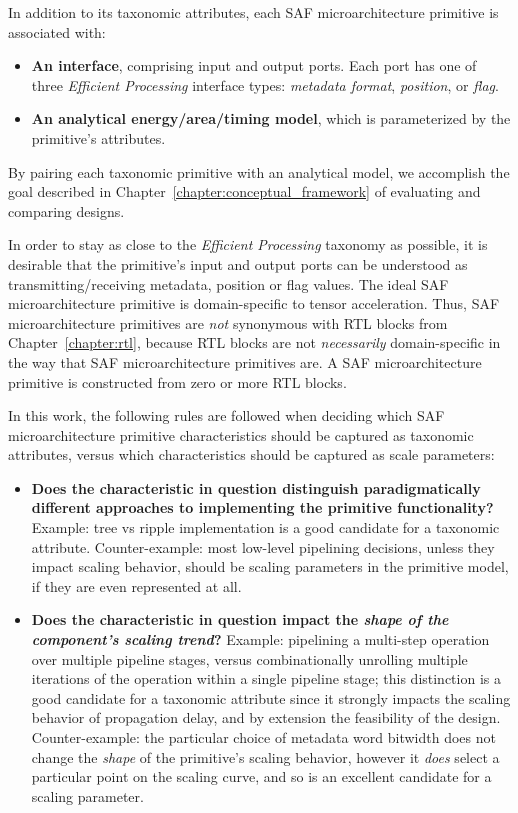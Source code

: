 In addition to its taxonomic attributes, each SAF microarchitecture primitive is associated with:

\begin{itemize}
    \item \textbf{An interface}, comprising input and output ports. Each port has one of three \textit{Efficient Processing} interface types: \textit{metadata format}, \textit{position}, or \textit{flag}.
    \item \textbf{An analytical energy/area/timing model}, which is parameterized by the primitive's attributes.
\end{itemize}

By pairing each taxonomic primitive with an analytical model, we accomplish the goal described in Chapter~\ref{chapter:conceptual_framework} of evaluating and comparing designs.

In order to stay as close to the \textit{Efficient Processing} taxonomy as possible, it is desirable that the primitive's input and output ports can be understood as transmitting/receiving metadata, position or flag values. The ideal SAF microarchitecture primitive is domain-specific to tensor acceleration. Thus, SAF microarchitecture primitives are \textit{not} synonymous with RTL blocks from Chapter~\ref{chapter:rtl}, because RTL blocks are not \textit{necessarily} domain-specific in the way that SAF microarchitecture primitives are. A SAF microarchitecture primitive is constructed from zero or more RTL blocks.

In this work, the following rules are followed when deciding which SAF microarchitecture primitive characteristics should be captured as taxonomic attributes, versus which characteristics should be captured as scale parameters:

\begin{itemize}
    \item \textbf{Does the characteristic in question distinguish paradigmatically different approaches to implementing the primitive functionality?} Example: tree vs ripple implementation is a good candidate for a taxonomic attribute. Counter-example: most low-level pipelining decisions, unless they impact scaling behavior, should be scaling parameters in the primitive model, if they are even represented at all.
    \item \textbf{Does the characteristic in question impact the \textit{shape of the component's scaling trend}?} Example: pipelining a multi-step operation over multiple pipeline stages, versus combinationally unrolling multiple iterations of the operation within a single pipeline stage; this distinction is a good candidate for a taxonomic attribute since it strongly impacts the scaling behavior of propagation delay, and by extension the feasibility of the design. Counter-example: the particular choice of metadata word bitwidth does not change the \textit{shape} of the primitive's scaling behavior, however it \textit{does} select a particular point on the scaling curve, and so is an excellent candidate for a scaling parameter.
\end{itemize}

